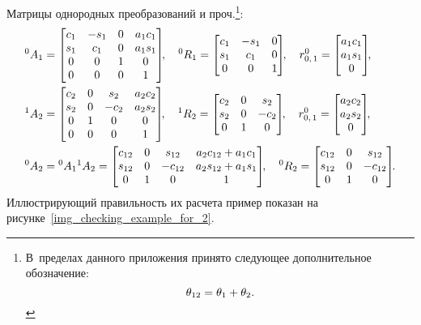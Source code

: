 Матрицы однородных преобразований и проч.\footnote{В~пределах данного приложения принято следующее дополнительное обозначение:
\begin{equation*}
    \theta_{12} = \theta_1 + \theta_2 \ldotp
\end{equation*}
}:
\begin{align}
    & {}^0A_1 =
    \begin{bmatrix}
        c_1 & -s_1 & 0 & a_1 c_1 \\
        s_1 &  c_1 & 0 & a_1 s_1 \\
        0 & 0 & 1 & 0 \\
        0 & 0 & 0 & 1
    \end{bmatrix}\!\!,
    \quad
    {}^0R_1 =
    \begin{bmatrix}
        c_1 & -s_1 & 0 \\
        s_1 &  c_1 & 0 \\
        0 & 0 & 1
    \end{bmatrix}\!\!,
    \quad
    r^0_{0,\,1} =
    \begin{bmatrix}
        a_1 c_1 \\ a_1 s_1 \\ 0
    \end{bmatrix}\!\!,
    \\
    & {}^1A_2 =
    \begin{bmatrix}
        c_2 & 0 &  s_2 & a_2 c_2 \\
        s_2 & 0 & -c_2 & a_2 s_2 \\
        0 & 1 & 0 & 0 \\
        0 & 0 & 0 & 1
    \end{bmatrix}\!\!,
    \quad
    {}^1R_2 =
    \begin{bmatrix}
        c_2 & 0 &  s_2 \\
        s_2 & 0 & -c_2 \\
        0 & 1 & 0
    \end{bmatrix}\!\!,
    \quad
    r^0_{0,\,1} =
    \begin{bmatrix}
        a_2 c_2 \\ a_2 s_2 \\ 0
    \end{bmatrix}\!\!,
    \\
    & {}^0A_2 = {}^0A_1 {}^1A_2 =
    \begin{bmatrix}
        c_{12} & 0 &  s_{12} & a_2 c_{12} + a_1 c_1 \\
        s_{12} & 0 & -c_{12} & a_2 s_{12} + a_1 s_1\\
        0 & 1 & 0 & 1
    \end{bmatrix}\!\!,
    \quad
    {}^0R_2 =
    \begin{bmatrix}
        c_{12} & 0 &  s_{12} \\
        s_{12} & 0 & -c_{12} \\
        0 & 1 & 0
    \end{bmatrix}\!\!\ldotp
\end{align}
Иллюстрирующий правильность их расчета пример показан на рисунке~\ref{img_checking_example_for_2}.

